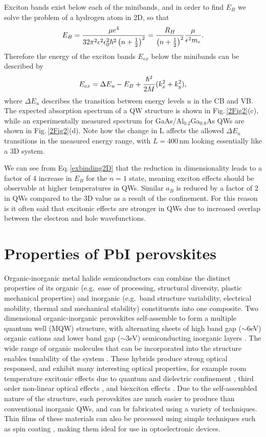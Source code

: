 Exciton bands exist below each of the minibands, and in order to find $E_B$ we solve the problem of a hydrogen atom in 2D, so that
\begin{equation}
\centering
E_B =\frac{\mu e^4}{32\pi^2\epsilon^2\epsilon_0^2\hbar^2\left(n+\frac{1}{2}\right)^2} = \frac{R_H}{\left(n+\frac{1}{2}\right)^2}\frac{\mu}{\epsilon^2 m_e} .
\label{exbinding2D}
\end{equation}
Therefore the energy of the exciton bands $E_{ex}$ below the minibands can be described by
\begin{equation}
\centering
E_{ex} = \Delta E_u - E_B + \frac{\hbar^2}{2M}(k_x^2+k_y^2) ,
\label{exenergy2D}
\end{equation}
where $\Delta E_u$ describes the transition between energy levels $u$ in the CB and VB. The expected absorption spectrum of a QW structure is shown in Fig.\,\ref{2Fig2}(c), while an experimentally measured spectrum for GaAs/Al$_{0.2}$Ga$_{0.8}$As QWs are shown in Fig.\,\ref{2Fig2}(d). Note how the change in L affects the allowed $\Delta E_u$ transitions in the measured energy range, with $L=400$\,nm looking essentially like a 3D system.

We can see from Eq.\,\ref{exbinding2D} that the reduction in dimensionality leads to a factor of 4 increase in $E_B$ for the $n=1$ state, meaning exciton effects should be observable at higher temperatures in QWs. Similar $a_B$ is reduced by a factor of 2 in QWs compared to the 3D value as a result of the confinement. For this reason is it often said that excitonic effects are stronger in QWs due to increased overlap between the electron and hole wavefunctions.

\section{Properties of PbI perovskites}
Organic-inorganic metal halide semiconductors can combine the distinct properties of its organic (e.g.\ ease of processing, structural diversity, plastic mechanical properties) and inorganic (e.g.\ band structure variability, electrical mobility, thermal and mechanical stability) constituents into one composite. Two dimensional organic-inorganic perovskites self-assemble to form a multiple quantum well (MQW) structure, with alternating sheets of high band gap ($\sim6$eV) organic cations and lower band gap ($\sim3$eV) semiconducting inorganic layers \cite{Ishihara1994, Pradeesh2009b}. The wide range of organic molecules that can be incorporated into the structure enables tunability of the system \cite{Sourisseau2007}. These hybrids produce strong optical responsed, and exhibit many interesting optical properties, for example room temperature excitonic effects due to quantum and dielectric confinement \cite{Ishihara1990}, third order non-linear optical effects \cite{Xu1991a}, and biexciton effects \cite{Ishihara1992a}. Due to the self-assembled nature of the structure, such perovskites are much easier to produce than conventional inorganic QWs, and can br fabricated using a variety of techniques. Thin films of these materials can also be processed using simple techniques such as spin coating \cite{Xu1991}, making them ideal for use in optoelectronic devices.

